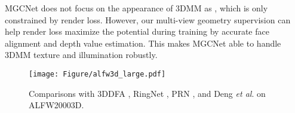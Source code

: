 \documentclass[runningheads]{llncs}
\newcommand{\etal}{\textit{et al}.}
\begin{document}
MGCNet does not focus on the appearance of 3DMM as \cite{unsuper_tewari2018self,unsuper_mul_tewari2019fml,unsuper_tran2019towards,super_chen2019photo,super_zeng2019df2net,super_review3_galteri2019deep,super_fit_tran2018extreme,super_iter_sela2017unrestricted}, which is only constrained by render loss.
However, our multi-view geometry supervision can help render loss maximize the potential during training by accurate face alignment and depth value estimation.
This makes MGCNet able to handle 3DMM texture and illumination robustly.


\begin{figure}[htbp]
	\centering
	\texttt{[image: Figure/alfw3d\_large.pdf]}
	\caption{Comparisons with 3DDFA \cite{dataset_aflw20003D_300WLP_zhu2016face}, RingNet \cite{unsuper_mul_sanyal2019learning_ring}, PRN \cite{super_fit_volu_exp_feng2018joint}, and Deng \etal \cite{unsuper_mul_ng2019accurate} on ALFW20003D.}
	\label{fig:alfw_large}
\end{figure}
\end{document}
